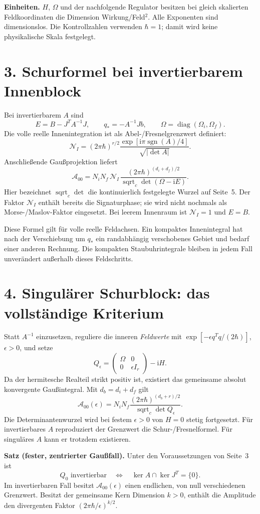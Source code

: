 \documentclass[10pt,a4paper]{article}
\newcommand{\ii}{\mathrm i}
\newcommand{\sgn}{\operatorname{sgn}}
\newcommand{\sdet}{\operatorname{sqrt}_{\!c}\det}
\newcommand{\sect}[1]{\section*{\color{navy}#1}}
\begin{document}
\textbf{Einheiten.} $H$, $\Omega$ und der nachfolgende Regulator besitzen bei
gleich skalierten Feldkoordinaten die Dimension Wirkung/Feld$^2$. Alle
Exponenten sind dimensionslos. Die Kontrollzahlen verwenden $\hbar=1$;
damit wird keine physikalische Skala festgelegt.

\sect{3. Schurformel bei invertierbarem Innenblock}
Bei invertierbarem $A$ sind
\[
E=B-J^TA^{-1}J,\qquad q_*=-A^{-1}Jb,
\qquad \Omega=\operatorname{diag}(\Omega_i,\Omega_f).
\]
Die volle reelle Innenintegration ist als Abel-/Fresnelgrenzwert definiert:
\[
\mathcal N_I=(2\pi\hbar)^{r/2}
\frac{\exp[\ii\pi\sgn(A)/4]}{\sqrt{|\det A|}}.
\]
Anschließende Gaußprojektion liefert
\[
\boxed{\mathcal A_{00}=
N_iN_f\,\mathcal N_I\,
\frac{(2\pi\hbar)^{(d_i+d_f)/2}}{\sdet(\Omega-\ii E)}.}
\]
Hier bezeichnet $\sdet$ die kontinuierlich festgelegte Wurzel auf Seite~5.
Der Faktor $\mathcal N_I$ enthält bereits die Signaturphase; sie wird nicht
nochmals als Morse-/Maslov-Faktor eingesetzt. Bei leerem Innenraum ist
$\mathcal N_I=1$ und $E=B$.

Diese Formel gilt für volle reelle Feldachsen. Ein kompaktes Innenintegral
hat nach der Verschiebung um $q_*$ ein randabhängig verschobenes Gebiet und
bedarf einer anderen Rechnung. Die kompakten Staubuhrintegrale bleiben in
jedem Fall unverändert außerhalb dieses Feldschritts.

\newpage
\sect{4. Singulärer Schurblock: das vollständige Kriterium}
Statt $A^{-1}$ einzusetzen, reguliere die inneren \emph{Feldwerte} mit
$\exp[-\epsilon q^Tq/(2\hbar)]$, $\epsilon>0$, und setze
\[
Q_\epsilon=
\begin{pmatrix}\Omega&0\\0&\epsilon I_r\end{pmatrix}-\ii H.
\]
Da der hermitesche Realteil strikt positiv ist, existiert das gemeinsame
absolut konvergente Gaußintegral. Mit $d_b=d_i+d_f$ gilt
\[
\boxed{\mathcal A_{00}(\epsilon)=
N_iN_f\frac{(2\pi\hbar)^{(d_b+r)/2}}{\sdet Q_\epsilon}.}
\]
Die Determinantenwurzel wird bei festem $\epsilon>0$ von $H=0$ stetig
fortgesetzt. Für invertierbares $A$ reproduziert der Grenzwert die
Schur-/Fresnelformel. Für singuläres $A$ kann er trotzdem existieren.

\textbf{Satz (fester, zentrierter Gaußfall).}
Unter den Voraussetzungen von Seite~3 ist
\[
Q_0\text{ invertierbar}
\quad\Longleftrightarrow\quad
\ker A\cap\ker J^T=\{0\}.
\]
Im invertierbaren Fall besitzt $\mathcal A_{00}(\epsilon)$ einen endlichen,
von null verschiedenen Grenzwert. Besitzt der gemeinsame Kern Dimension
$k>0$, enthält die Amplitude den divergenten Faktor
$(2\pi\hbar/\epsilon)^{k/2}$.
\end{document}
